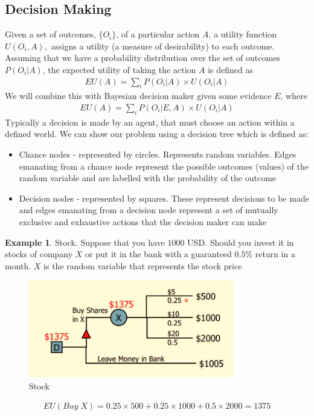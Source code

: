 \documentclass[a4paper]{article}
\theoremstyle{plain}
\theoremstyle{definition}
\newtheorem{exmp}{Example}[section]
\theoremstyle{remark}
\begin{document}
\subsection{Decision Making}
Given a set of outcomes, $\{O_i\}$, of a particular action $A$, a utility function $U(O_i,A),$ assigns a utility (a measure of desirability) to each outcome. Assuming that we have a probability distribution over the set of outcomes $P(O_i|A)$, the expected utility of taking the action $A$ is defined as 
\begin{align*}
	EU(A) = \sum_{i}^{} P(O_i|A) \times U(O_i|A)
\end{align*}
We will combine this with Bayesian decision maker given some evidence $E$, where
\begin{align*}
	EU(A) = \sum_{i}^{} P(O_i|E,A) \times U(O_i|A)
\end{align*}
Typically a decision is made by an agent, that must choose an action within a defined world. We can show our problem using a decision tree which is defined as:
\begin{itemize}
	\item Chance nodes - represented by circles. Represents random variables. Edges emanating from a chance node represent the possible outcomes (values) of the random variable and are labelled with the probability of the outcome
	\item Decision nodes - represented by squares. These represent decisions to be made and edges emanating from a decision node represent a set of mutually exclusive and exhaustive actions that the decision maker can make
\end{itemize}
\begin{exmp}
	Stock. Suppose that you have $1000$ USD. Should you invest it in stocks of company $X$ or put it in the bank with a guaranteed $0.5\%$ return in a month. $X$ is the random variable that represents the stock price
	\begin{figure}[H]
		\centering
		\includegraphics[width=0.8\textwidth]{st.png}
		\caption{Stock}
		\label{fig:st-png}
	\end{figure}
	\begin{align*}
		EU(Buy \;X) = 0.25\times 500+0.25\times 1000+0.5\times 2000 = 1375
	\end{align*}
\end{exmp}
\end{document}
